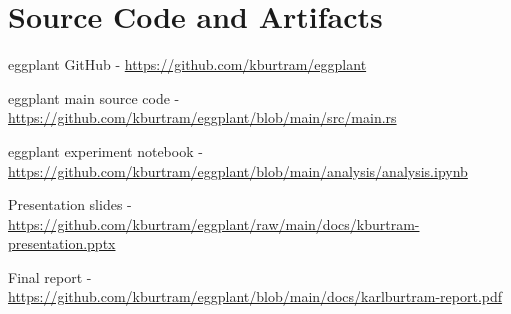 \documentclass{article}
\begin{document}
\section*{Source Code and Artifacts}

\noindent eggplant GitHub - \href{https://github.com/kburtram/eggplant}{https://github.com/kburtram/eggplant}

\null

\noindent eggplant main source code - \noindent \href{https://github.com/kburtram/eggplant/blob/main/src/main.rs}{https://github.com/kburtram/eggplant/blob/main/src/main.rs}

\null

\noindent eggplant experiment notebook - \href{https://github.com/kburtram/eggplant/blob/main/analysis/analysis.ipynb}{https://github.com/kburtram/eggplant/blob/main/analysis/analysis.ipynb}

\null

\noindent Presentation slides - \href{https://github.com/kburtram/eggplant/raw/main/docs/kburtram-presentation.pptx}{https://github.com/kburtram/eggplant/raw/main/docs/kburtram-presentation.pptx}

\null

\noindent Final report - \href{https://github.com/kburtram/eggplant/blob/main/docs/karlburtram-report.pdf}{https://github.com/kburtram/eggplant/blob/main/docs/karlburtram-report.pdf}
\end{document}
